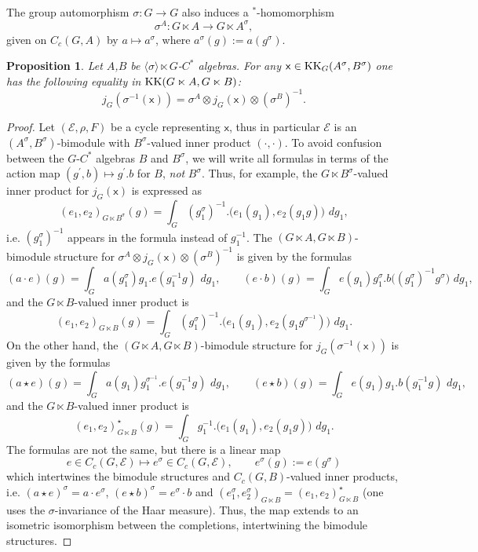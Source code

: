 \documentclass[11pt,reqno]{amsart}
\newtheorem{proposition}[theorem]{Proposition}
\theoremstyle{definition}
\theoremstyle{remark}
\newcommand{\st}[1]{\mathsf{#1}}
\def\E{\ensuremath{\mathcal{E}}}
\def\KK{\ensuremath{\textnormal{KK}}}
\begin{document}
The group automorphism $\sigma \colon G \rightarrow G$ also induces a $^\ast$-homomorphism
\begin{equation} 
\label{eqn:descentsigma}
\sigma^A \colon G \ltimes A \rightarrow G \ltimes A^\sigma,
\end{equation}
given on $C_c(G,A)$ by $a \mapsto a^\sigma$, where $a^\sigma(g):=a(g^\sigma)$.
\begin{proposition}
\label{prop:DescentMapTwist}
Let $A$,$B$ be $\langle \sigma \rangle \ltimes G$-$C^\ast$ algebras.  For any $\st{x} \in \KK_G(A^\sigma,B^\sigma)$ one has the following equality in $\KK(G\ltimes A,G\ltimes B)$:
\[ j_G(\sigma^{-1}(\st{x}))=\sigma^A \otimes j_G(\st{x})\otimes (\sigma^B)^{-1}.\]
\end{proposition}
\begin{proof}
Let $(\E,\rho,F)$ be a cycle representing $\st{x}$, thus in particular $\E$ is an $(A^\sigma,B^\sigma)$-bimodule with $B^\sigma$-valued inner product $(\cdot,\cdot)$.  To avoid confusion between the $G$-$C^\ast$ algebras $B$ and $B^\sigma$, we will write all formulas in terms of the action map $(g^\prime,b)\mapsto g^\prime.b$ for $B$, \emph{not} $B^\sigma$.  Thus, for example, the $G\ltimes B^\sigma$-valued inner product for $j_G(\st{x})$ is expressed as
\[ (e_1,e_2)_{G\ltimes B^\sigma}(g)=\int_G (g_1^\sigma)^{-1}.\big(e_1(g_1),e_2(g_1g)\big)\,\,dg_1,\]
i.e. $(g_1^\sigma)^{-1}$ appears in the formula instead of $g_1^{-1}$.  The $(G\ltimes A,G\ltimes B)$-bimodule structure for $\sigma^A \otimes j_G(\st{x})\otimes (\sigma^B)^{-1}$ is given by the formulas
\[ (a\cdot e)(g)=\int_G a(g_1^\sigma)g_1.e(g_1^{-1}g)\,\,dg_1, \qquad (e\cdot b)(g)=\int_G e(g_1)g_1^\sigma.b\big((g_1^\sigma)^{-1}g^\sigma\big)\,\,dg_1, \]
and the $G\ltimes B$-valued inner product is
\[ (e_1,e_2)_{G\ltimes B}(g)=\int_G (g_1^\sigma)^{-1}.\big(e_1(g_1),e_2(g_1g^{\sigma^{-1}})\big)\,\, dg_1.\]
On the other hand, the $(G\ltimes A,G\ltimes B)$-bimodule structure for $j_G(\sigma^{-1}(\st{x}))$ is given by the formulas
\[ (a \star e)(g)=\int_G a(g_1)g_1^{\sigma^{-1}}.e(g_1^{-1}g)\,\,dg_1, \qquad (e \star b)(g)=\int_G e(g_1)g_1.b(g_1^{-1}g)\,\,dg_1, \]
and the $G\ltimes B$-valued inner product is
\[ (e_1,e_2)^{\star}_{G\ltimes B}(g)=\int_G g_1^{-1}.\big(e_1(g_1),e_2(g_1g)\big)\,\,dg_1.\]
The formulas are not the same, but there is a linear map
\[ e \in C_c(G,\E) \mapsto e^\sigma \in C_c(G,\E), \qquad e^\sigma(g):=e(g^\sigma) \]
which intertwines the bimodule structures and $C_c(G,B)$-valued inner products, i.e. $(a \star e)^\sigma=a\cdot e^\sigma$, $(e \star b)^\sigma=e^\sigma\cdot b$ and $(e_1^\sigma,e_2^\sigma)_{G\ltimes B}=(e_1,e_2)^{\star}_{G\ltimes B}$ (one uses the $\sigma$-invariance of the Haar measure).  Thus, the map extends to an isometric isomorphism between the completions, intertwining the bimodule structures.
\end{proof}
\end{document}
